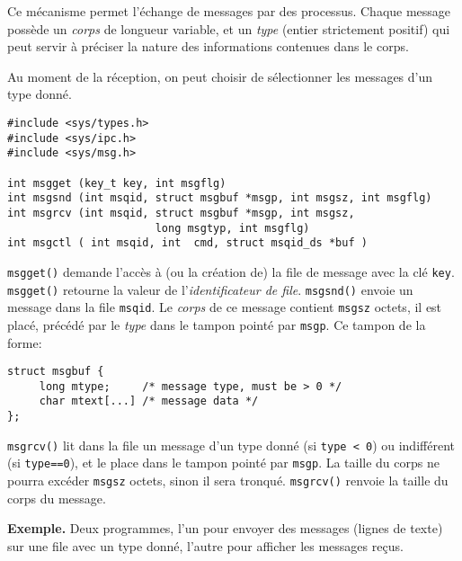
Ce mécanisme permet l'échange de messages par des processus. Chaque message
possède un \emph{corps} de longueur variable, et un \emph{type} (entier 
strictement positif) qui peut servir à préciser la nature des informations
contenues dans le corps. 

Au moment de la réception, on peut choisir de sélectionner les messages
d'un type donné. 


\extrait
\begin{lstlisting}
#include <sys/types.h>
#include <sys/ipc.h>
#include <sys/msg.h>

int msgget (key_t key, int msgflg)
int msgsnd (int msqid, struct msgbuf *msgp, int msgsz, int msgflg)
int msgrcv (int msqid, struct msgbuf *msgp, int msgsz, 
                       long msgtyp, int msgflg)
int msgctl ( int msqid, int  cmd, struct msqid_ds *buf )
\end{lstlisting}


\texttt{msgget()} demande l'accès à (ou la création de) la file de
message avec la clé \texttt{key}. \texttt{msgget()} retourne la valeur
de l'\emph{identificateur de file}. 
 \texttt{msgsnd()} envoie un
message dans la file \texttt{msqid}. Le \emph{corps} de ce message
contient \texttt{msgsz} octets, il est placé, précédé par le
\emph{type} dans le tampon pointé par \texttt{msgp}. Ce tampon de la
forme:

\extrait
\begin{lstlisting}
struct msgbuf {
     long mtype;     /* message type, must be > 0 */
     char mtext[...] /* message data */
};
\end{lstlisting}


\texttt{msgrcv()} lit dans la file un message d'un type donné (si
\verb/type < 0/) ou indifférent (si \texttt{type==0}), et le
place dans le tampon pointé par \texttt{msgp}. La taille du corps ne
pourra excéder \texttt{msgsz} octets, sinon il sera
tronqué. \texttt{msgrcv()} renvoie la taille du corps du message. 


\textbf{Exemple.} Deux programmes, l'un pour envoyer des messages (lignes
de texte) sur une file avec un type donné, l'autre pour afficher les
messages reçus.


 
\source




 
\source


